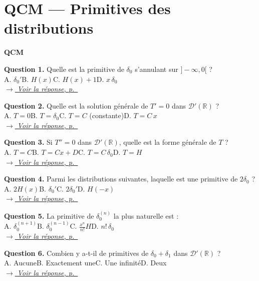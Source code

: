 \documentclass[12pt,a4paper,openany]{book}
\theoremstyle{definition}
\theoremstyle{plain}
\theoremstyle{remark}
\newenvironment{qcmblock}{%
	\begin{mdframed}[linewidth=0.5pt, linecolor=black!35,
		backgroundcolor=gray!5,
		skipabove=12pt, skipbelow=12pt,
		innerleftmargin=12pt, innerrightmargin=8pt,
		innertopmargin=8pt, innerbottommargin=8pt]%
		\noindent\textbf{\scshape QCM}\par\smallskip%
	}{%
	\end{mdframed}%
}
\newcommand{\navtoQCMRep}[2]{%
	\vspace{2pt}%
	\noindent\hfill{\small\itshape%
		\hyperlink{qcmrep:#1:q#2}{$\rightarrow$ Voir la réponse, p.~\pageref*{qcmrep:#1:q#2}}%
	}%
	\vspace{6pt}%
}
\begin{document}
	\section{QCM — Primitives des distributions}
	
	\begin{qcmblock}
		\hypertarget{qcm:ch4:start}{}\label{qcm:ch4:start}
		\hypertarget{qcm:ch4:q1}{}\label{qcm:ch4:q1}
		\textbf{Question 1.} Quelle est la primitive de $\delta_0$ s'annulant sur $]-\infty, 0[$ ?\\
		A. $\delta_0'$\quad B. $H(x)$\quad C. $H(x) + 1$\quad D. $x\,\delta_0$\\
		\navtoQCMRep{ch4}{1}
		
		\medskip
		\hypertarget{qcm:ch4:q2}{}\label{qcm:ch4:q2}
		\textbf{Question 2.} Quelle est la solution générale de $T' = 0$ dans $\mathcal{D}'(\mathbb{R})$ ?\\
		A. $T = 0$\quad B. $T = \delta_0$\quad C. $T = C$ (constante)\quad D. $T = C\,x$\\
		\navtoQCMRep{ch4}{2}
		
		\medskip
		\hypertarget{qcm:ch4:q3}{}\label{qcm:ch4:q3}
		\textbf{Question 3.} Si $T'' = 0$ dans $\mathcal{D}'(\mathbb{R})$, quelle est la forme générale de $T$ ?\\
		A. $T = C$\quad B. $T = Cx + D$\quad C. $T = C\,\delta_0$\quad D. $T = H$\\
		\navtoQCMRep{ch4}{3}
		
		\medskip
		\hypertarget{qcm:ch4:q4}{}\label{qcm:ch4:q4}
		\textbf{Question 4.} Parmi les distributions suivantes, laquelle est une primitive de $2\delta_0$ ?\\
		A. $2H(x)$\quad B. $\delta_0'$\quad C. $2\delta_0'$\quad D. $H(-x)$\\
		\navtoQCMRep{ch4}{4}
		
		\medskip
		\hypertarget{qcm:ch4:q5}{}\label{qcm:ch4:q5}
		\textbf{Question 5.} La primitive de $\delta_0^{(n)}$ la plus naturelle est :\\
		A. $\delta_0^{(n+1)}$\quad B. $\delta_0^{(n-1)}$\quad C. $\frac{x^n}{n!}H$\quad D. $n!\,\delta_0$\\
		\navtoQCMRep{ch4}{5}
		
		\medskip
		\hypertarget{qcm:ch4:q6}{}\label{qcm:ch4:q6}
		\textbf{Question 6.} Combien y a-t-il de primitives de $\delta_0 + \delta_1$ dans $\mathcal{D}'(\mathbb{R})$ ?\\
		A. Aucune\quad B. Exactement une\quad C. Une infinité\quad D. Deux\\
		\navtoQCMRep{ch4}{6}
		

\end{qcmblock}
\end{document}

